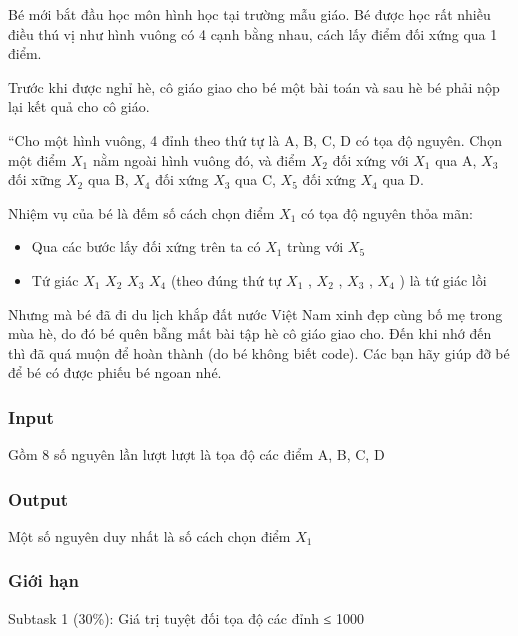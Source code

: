





   Bé mới bắt đầu học môn hình học tại trường mẫu giáo. Bé được học rất nhiều điều thú vị như hình vuông có 4 cạnh bằng nhau, cách lấy điểm đối xứng qua 1 điểm.  

   Trước khi được nghỉ hè, cô giáo giao cho bé một bài toán và sau hè bé phải nộp lại kết quả cho cô giáo.  

   “Cho một hình vuông, 4 đỉnh theo thứ tự là A, B, C, D có tọa độ nguyên. Chọn một điểm $X_{1}$   nằm ngoài hình vuông đó, và điểm $X_{2}$   đối xứng với $X_{1}$   qua A, $X_{3}$   đối xững $X_{2}$   qua B, $X_{4}$   đối xứng $X_{3}$   qua C, $X_{5}$   đối xứng $X_{4}$   qua D.  

   Nhiệm vụ của bé là đếm số cách chọn điểm $X_{1}$   có tọa độ nguyên thỏa mãn:  
\begin{itemize}
	\item     Qua các bước lấy đối xứng trên ta có $X_{1}$    trùng với $X_{5}$
	\item     Tứ giác $X_{1}$    $X_{2}$    $X_{3}$    $X_{4}$    (theo đúng thứ tự $X_{1}$    , $X_{2}$    , $X_{3}$    , $X_{4}$    ) là tứ giác lồi   
\end{itemize}

   Nhưng mà bé đã đi du lịch khắp đất nước Việt Nam xinh đẹp cùng bố mẹ trong mùa hè, do đó bé quên bẵng mất bài tập hè cô giáo giao cho. Đến khi nhớ đến thì đã quá muộn để hoàn thành (do bé không biết code). Các bạn hãy giúp đỡ bé để bé có được phiếu bé ngoan nhé.  

\subsubsection{   Input  }

   Gồm 8 số nguyên lần lượt lượt là tọa độ các điểm A, B, C, D  

\subsubsection{   Output  }

   Một số nguyên duy nhất là số cách chọn điểm $X_{1}$

\subsubsection{   Giới hạn  }

   Subtask 1 (30\%): Giá trị tuyệt đối tọa độ các đỉnh ≤ 1000  

